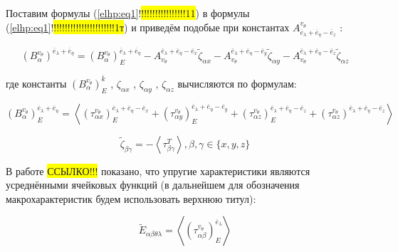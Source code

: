 Поставим формулы 
(\ref{elhp:eq1}!\colorbox{yellow}{!!!!!!!!!!!!!!!!11})
в формулы 
(\ref{elhp:eq1}!\colorbox{yellow}{!!!!!!!!!!!!!!!!!!!!!!1т})
и приведём подобые при константах 
${A}_{ \overline{e}_{\lambda} + \overline{e}_{\eta} - \overline{e}_z}^{ v_{\theta}} $
:

\begin{equation}
    \label{elhp:eq49}
    \left( B_{\alpha}^{v_{\theta}} \right)^{ \overline{e}_{\lambda} + \overline{e}_{\eta}  } 
    =
    \left( B_{\alpha}^{v_{\theta}} \right)^{ \overline{e}_{\lambda} + \overline{e}_{\eta}  }_E
    -
    A_{v_{\theta}}^{\overline{e}_{\lambda} + \overline{e}_{\eta} - \overline{e}_x }
    \widetilde{\zeta}_{\alpha x}
    -
    A_{v_{\theta}}^{\overline{e}_{\lambda} + \overline{e}_{\eta} - \overline{e}_y }
    \widetilde{\zeta}_{\alpha y}
    -
    A_{v_{\theta}}^{\overline{e}_{\lambda} + \overline{e}_{\eta} - \overline{e}_z }
    \widetilde{\zeta}_{\alpha z}
\end{equation}

где константы 
$ \left( B_{\alpha}^{ v_{\theta}} \right)_E^{ \overline{k}} $
, 
${\zeta}_{\alpha x}$ 
, 
${\zeta}_{\alpha y}$ 
,
${\zeta}_{\alpha z}$ 
вычисляются по формулам:

\begin{equation}
    \label{elhp:eq50}
    \left( B_{\alpha}^{v_{\theta}} \right)^{ \overline{e}_{\lambda} + \overline{e}_{\eta}  }_E
    =
    \left< 
    \left( \tau_{\alpha x}^{v_{\theta}} \right)_E^{\overline{e}_{\lambda} + \overline{e}_{\eta} - \overline{e}_x } 
    +
    \left( \tau_{\alpha y}^{v_{\theta}} \right)_E^{\overline{e}_{\lambda} + \overline{e}_{\eta} - \overline{e}_y } 
    +
    \left( \tau_{\alpha z}^{v_{\theta}} \right)_E^{\overline{e}_{\lambda} + \overline{e}_{\eta} - \overline{e}_z } 
    +
    \left( \tau_{\alpha z}^{v_{\theta}} \right)^{\overline{e}_{\lambda} + \overline{e}_{\eta} - \overline{e}_z } 
    \right> 
\end{equation}

\begin{equation}
    \label{elhp:eq51}
    \widetilde{\zeta}_{\beta \gamma} = 
    - \left< \tau_{\beta \gamma}^T \right> , \beta,\gamma \in \{x,y,z\} 
\end{equation}

В работе \colorbox{yellow}{ССЫЛКО!!!} показано, что упругие характеристики являются усреднёнными ячейковых
функций (в дальнейшем для обозначения макрохарактеристик будем использовать верхнюю
титул):

\begin{equation}
    \label{elhp:eq52}
    \widetilde{E}_{ \alpha\beta \theta\lambda} =
    \left< \left( \tau_{ \alpha\beta}^{ v_{\theta}} \right)_E^{ \overline{e}_{\lambda}}  \right> 
\end{equation}

